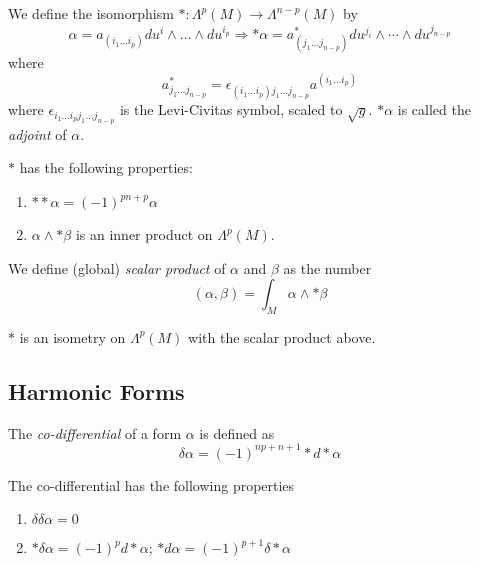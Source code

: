 \begin{defn}

	We define the isomorphism $*: \Lambda^{ p }(M) \to \Lambda^{ n-p }(M)$ by 
	\[
		\alpha = a_{ \left( i_1 \ldots i_p \right) } du^i \wedge \ldots \wedge du^{ i_p } \Rightarrow * \alpha = a^*_{ \left( j_1 \ldots j_{ n-p } \right) } du^{ j_i } \wedge \cdots \wedge du^{ j_{ n-p } }
	\]
where
\[
	a^*_{ j_1 \ldots j_{ n-p } } = \epsilon_{ \left( i_1 \ldots i_p \right) j_1 \ldots j_{ n-p } } a^{ \left( i_1 \ldots i_p \right) }
\]
where $ \epsilon_{ i_1 \ldots i_p j_1 \ldots j_{ n-p } }$ is the Levi-Civitas symbol, scaled to $ \sqrt{g}$. $* \alpha$ is called the \textit{adjoint} of $ \alpha$.

\end{defn}

\begin{prop}

$*$ has the following properties:
\begin{enumerate}
	\item $ ** \alpha = (-1)^{ pn+p } \alpha$
	\item $ \alpha \wedge * \beta$ is an inner product on $ \Lambda^p (M)$.
\end{enumerate}

\end{prop}

\begin{defn}

	We define (global) \textit{scalar product} of $ \alpha$ and $ \beta$ as the number
	\[
		\left(  \alpha, \beta \right) = \int_M \alpha \wedge * \beta
	\]
\end{defn}

\begin{prop}

	$*$ is an isometry on $ \Lambda^p(M)$ with the scalar product above.

\end{prop}

\subsection{Harmonic Forms}

\begin{defn}

The \textit{co-differential} of a form $ \alpha$ is defined as
\[
	\delta \alpha = (-1)^{ np+n+1 } * d* \alpha
\]

\end{defn}

\begin{prop}

The co-differential has the following properties
\begin{enumerate}
	\item $ \delta \delta \alpha = 0$
	\item $ * \delta \alpha = (-1)^p d * \alpha$; $* d \alpha = (-1)^{ p+1 } \delta * \alpha$
\end{enumerate}

\end{prop}

